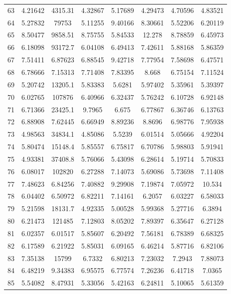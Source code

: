 \begin{figure}
\begin{tabular}{cccccccc}
63 & 4.21642 & 4315.31 & 4.32867 & 5.17689 & 4.29473 & 4.70596 & 4.83521\\
64 & 5.27832 & 79753 & 5.11255 & 9.40166 & 8.30661 & 5.52206 & 6.20119\\
65 & 8.50477 & 9858.51 & 8.75755 & 5.84533 & 12.278 & 8.78859 & 6.45973\\
66 & 6.18098 & 93172.7 & 6.04108 & 6.49413 & 7.42611 & 5.88168 & 5.86359\\
67 & 7.51411 & 6.87623 & 6.88545 & 9.42718 & 7.77954 & 7.58698 & 6.47571\\
68 & 6.78666 & 7.15313 & 7.71408 & 7.83395 & 8.668 & 6.75154 & 7.11524\\
69 & 5.20742 & 13205.1 & 5.83383 & 5.6281 & 5.97402 & 5.35961 & 5.39397\\
70 & 6.02765 & 107876 & 6.40966 & 6.32437 & 5.76242 & 6.10728 & 6.92148\\
71 & 6.71366 & 23425.1 & 9.7965 & 6.675 & 6.77867 & 6.36746 & 6.13763\\
72 & 6.88908 & 7.62445 & 6.66949 & 8.89236 & 8.8696 & 6.98776 & 7.95938\\
73 & 4.98563 & 34834.1 & 4.85086 & 5.5239 & 6.01514 & 5.05666 & 4.92204\\
74 & 5.80474 & 15148.4 & 5.85557 & 6.75817 & 6.70786 & 5.98803 & 5.91941\\
75 & 4.93381 & 37408.8 & 5.76066 & 5.43098 & 6.28614 & 5.19714 & 5.70833\\
76 & 6.08017 & 102820 & 6.27288 & 7.14073 & 5.69086 & 5.73698 & 7.11408\\
77 & 7.48623 & 6.84256 & 7.40882 & 9.29908 & 7.19874 & 7.05972 & 10.534\\
78 & 6.04402 & 6.50972 & 6.82211 & 7.14161 & 6.2057 & 6.03227 & 6.58033\\
79 & 5.21598 & 18131.7 & 4.92335 & 5.00528 & 5.99368 & 5.27716 & 6.3894\\
80 & 6.21473 & 121485 & 7.12803 & 8.05202 & 7.89397 & 6.35647 & 6.27128\\
81 & 6.02357 & 6.01517 & 5.85607 & 6.20492 & 7.56181 & 6.78389 & 6.68325\\
82 & 6.17589 & 6.21922 & 5.85031 & 6.09165 & 6.46214 & 5.87716 & 6.82106\\
83 & 7.35138 & 15799 & 6.7332 & 6.80213 & 7.23032 & 7.2943 & 7.88073\\
84 & 6.48219 & 9.34383 & 6.95575 & 6.77574 & 7.26236 & 6.41718 & 7.0365\\
85 & 5.54082 & 8.47931 & 5.33056 & 5.42163 & 6.24811 & 5.10065 & 5.61359\\

\end{tabular}
\end{figure}
